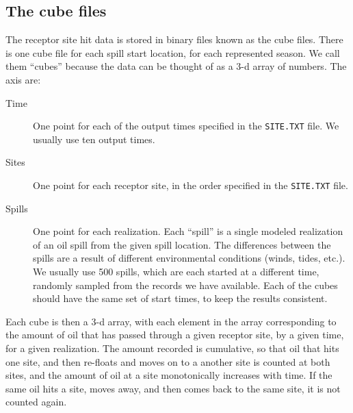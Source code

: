 \documentclass[12pt]{article}      %
\newcommand{\filename}[1]{\texttt{#1}}
\begin{document}
\subsection{The cube files}
The receptor site hit data is stored in binary files known as the 
cube files. There is one cube file for each spill start location, for 
each represented season. We call them ``cubes'' because the data can 
be thought of as a 3-d array of numbers. The axis are:
\begin{description}
\item[Time] One point for each of the output times specified in the 
\filename{SITE.TXT} file. We usually use ten output times.
\item[Sites] One point for each receptor site, in the order specified 
in the \filename{SITE.TXT} file.
\item[Spills] One point for each realization. Each ``spill'' is a 
single modeled realization of an oil spill from the given spill 
location. The differences between the spills are a result of 
different environmental conditions (winds, tides, etc.). We usually 
use 500 spills, which are each started at a different time, randomly 
sampled from the records we have available. Each of the cubes should 
have the same set of start times, to keep the results consistent.
\end{description}
Each cube is then a 3-d array, with each element in the array 
corresponding to the amount of oil that has passed through a given 
receptor site, by a given time, for a given realization. The amount 
recorded is cumulative, so that oil that hits one site, and then 
re-floats and moves on to a another site is counted at both sites, and the amount 
of oil at a site monotonically increases with time. If the same oil 
hits a site, moves away, and then comes back to the same site, it is 
not counted again.
\end{document}
